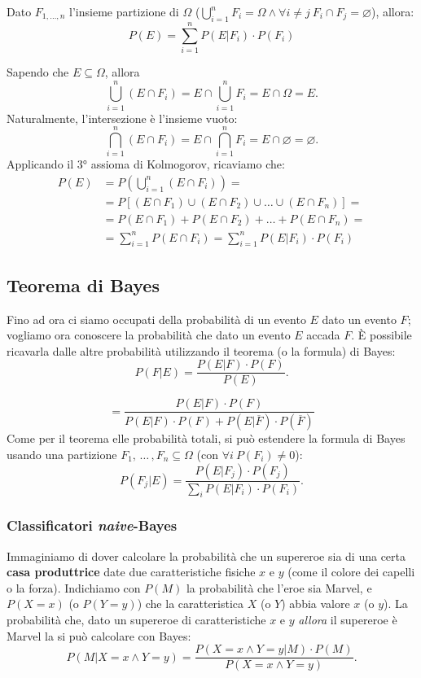 \begin{corollario}
Dato $F_{1, \dots, n}$ l'\textnormal{insieme partizione} di $\Omega$ ($\bigcup_{i=1}^n F_i = \Omega \land \forall i \neq j \ F_i \cap F_j = \varnothing$), allora: \[
\boxed{
P(E) = \sum_{i=1}^n P(E | F_i) \cdot P(F_i)
}
\]
\end{corollario}
\begin{dimostrazione}
Sapendo che $E \subseteq \Omega$, allora \[
\bigcup_{i=1}^n (E \cap F_i) = E \cap \bigcup_{i=1}^n F_i = E \cap \Omega = E.
\]
Naturalmente, l'intersezione è l'insieme vuoto: \[ 
\bigcap_{i=1}^n (E \cap F_i) = E \cap \bigcap_{i=1}^n F_i = E \cap \varnothing = \varnothing.
\]
Applicando il 3° assioma di Kolmogorov, ricaviamo che: \begin{align*}
    P(E) &= P\left(\bigcup_{i=1}^n (E \cap F_i) \right) = \\
    &= P[(E \cap F_1) \cup (E \cap F_2) \cup \dots \cup (E \cap F_n)] = \\
    &= P(E \cap F_1) + P(E \cap F_2) + \dots + P(E \cap F_n) = \\
    &= \sum_{i=1}^n P(E \cap F_i) = \sum_{i=1}^n P(E | F_i) \cdot P(F_i) \tag*{$\blacksquare$}
\end{align*}
\end{dimostrazione}

\subsection{Teorema di Bayes}
Fino ad ora ci siamo occupati della probabilità di un evento $E$ dato un evento $F$; vogliamo ora conoscere la probabilità che dato un evento $E$ accada $F$. È possibile ricavarla dalle altre probabilità utilizzando il teorema (o la formula) di Bayes:
$$
\boxed{
    P(F|E) = \frac{P(E|F) \cdot P(F)}{P(E)} 
}.
$$

$$= \frac{P(E|F) \cdot P(F)}{P(E|F) \cdot P(F) + P(E|\overline{F}) \cdot P(\overline{F})}
$$
Come per il teorema elle probabilità totali, si può estendere la formula di Bayes usando una partizione $F_1, \, \dots \, , F_n \subseteq \Omega$ (con $\forall i \: P(F_i) \neq 0$):
$$
P(F_j|E) = \frac{P(E|F_j) \cdot P(F_j)}{\sum_i{P(E|F_i) \cdot P(F_i)}}.
$$

\subsubsection{Classificatori \textit{naive}-Bayes}
Immaginiamo di dover calcolare la probabilità che un supereroe sia di una certa \textbf{casa produttrice} date due caratteristiche fisiche $x$ e $y$ (come il colore dei capelli o la forza).
Indichiamo con $P(M)$ la probabilità che l'eroe sia Marvel, e $P(X=x)$ (o $P(Y=y)$) che la caratteristica $X$ (o $Y$) abbia valore $x$ (o $y$). 
La probabilità che, dato un supereroe di caratteristiche $x$ e $y$ \textit{allora} il supereroe è Marvel la si può calcolare con Bayes:
\[ 
P(M|X=x \wedge Y=y) = \frac{P(X=x \wedge Y=y | M) \cdot P(M)}{P(X=x \wedge Y=y)}.
\]

